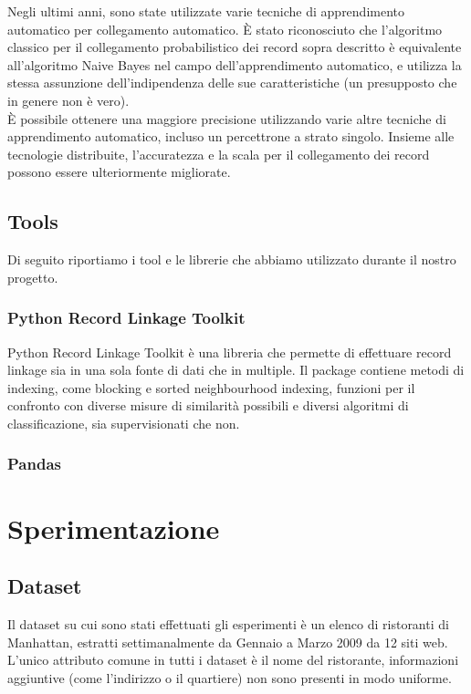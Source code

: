 \documentclass[a4paper,12pt]{article}
\begin{document}
\begin{description}[align=left]
	\item[Machine learning] Negli ultimi anni, sono state utilizzate varie tecniche di apprendimento automatico per collegamento automatico. È stato riconosciuto che l'algoritmo classico per il collegamento probabilistico dei record sopra descritto è equivalente all'algoritmo Naive Bayes nel campo dell'apprendimento automatico, e utilizza la stessa assunzione dell'indipendenza delle sue caratteristiche (un presupposto che in genere non è vero).\\È possibile ottenere una maggiore precisione utilizzando varie altre tecniche di apprendimento automatico, incluso un percettrone a strato singolo. Insieme alle tecnologie distribuite, l'accuratezza e la scala per il collegamento dei record possono essere ulteriormente migliorate.	
\end{description}

\subsection{Tools}
Di seguito riportiamo i tool e le librerie che abbiamo utilizzato durante il nostro progetto.

\subsubsection{Python Record Linkage Toolkit }
Python Record Linkage Toolkit è una libreria che permette di effettuare record linkage sia in una sola fonte di dati che in multiple. Il package contiene metodi di indexing, come blocking e sorted neighbourhood indexing, funzioni per il confronto con diverse misure di similarità possibili e diversi algoritmi di classificazione, sia supervisionati che non. 

\subsubsection{Pandas}


\section{Sperimentazione}

\subsection{Dataset}
Il dataset su cui sono stati effettuati gli esperimenti è un elenco di ristoranti di Manhattan, estratti settimanalmente da Gennaio a Marzo 2009 da 12 siti web. L'unico attributo comune in tutti i dataset è il nome del ristorante, informazioni aggiuntive (come l'indirizzo o il quartiere) non sono presenti in modo uniforme.
\end{document}
